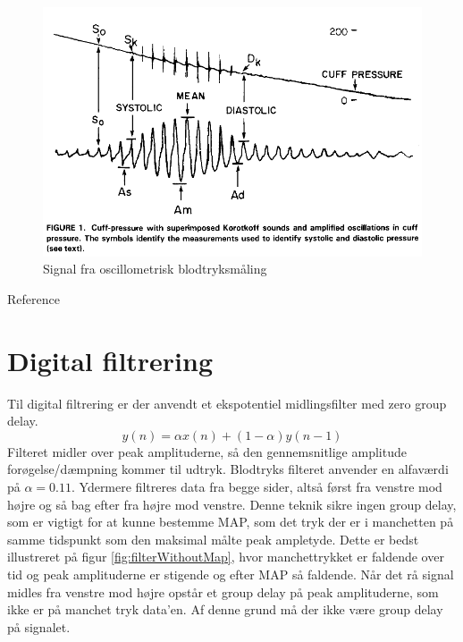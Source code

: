 \begin{figure}[H]
	\includegraphics[width=\textwidth]{Implementeringsdokument/billeder/OptimalBlodtryksmaling.png}
	\caption{Signal fra oscillometrisk blodtryksmåling }\label{fig:goodMeasurement}
\end{figure}
Reference 

\section{Digital filtrering} \label{title:digitalFilter}
Til digital filtrering er der anvendt et ekspotentiel midlingsfilter med zero group delay.
\begin{equation}
	y(n) = \alpha x(n)+(1-\alpha )y(n-1)
\end{equation}
Filteret midler over peak amplituderne, så den gennemsnitlige amplitude forøgelse/dæmpning kommer til udtryk. Blodtryks filteret anvender en alfaværdi på $\alpha = 0.11$. Ydermere filtreres data fra begge sider, altså først fra venstre mod højre og så bag efter fra højre mod venstre. Denne teknik sikre ingen group delay, som er vigtigt for at kunne bestemme MAP, som det tryk der er i manchetten på samme tidspunkt som den maksimal målte peak ampletyde. Dette er bedst illustreret på figur \ref{fig:filterWithoutMap}, hvor manchettrykket er faldende over tid og peak amplituderne er stigende og efter MAP så faldende. Når det rå signal midles fra venstre mod højre opstår et group delay på peak amplituderne, som ikke er på manchet tryk data'en. Af denne grund må der ikke være group delay på signalet.

